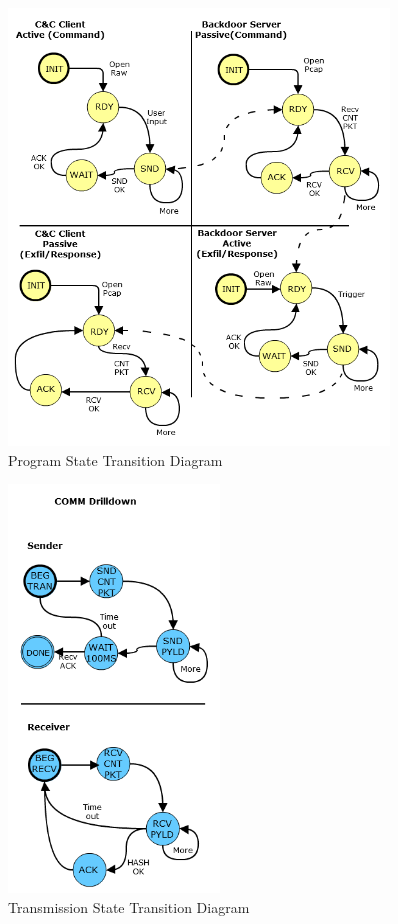 \documentclass[titlepage]{article}
\begin{document}
\begin{figure}[htb]                                                                       
  \begin{center}
    \includegraphics[width=0.9\textwidth]{imgs/std.png}
  \end{center}
  \caption{Program State Transition Diagram}
  \label{fig:std}
\end{figure}

\begin{figure}[htb]                                                                       
  \begin{center}
    \includegraphics[width=0.5\textwidth]{imgs/comm.png}
  \end{center}
  \caption{Transmission State Transition Diagram}
  \label{fig:comm}
\end{figure}
\end{document}

